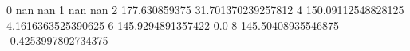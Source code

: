 0 nan nan
1 nan nan
2 177.630859375 31.701370239257812
4 150.09112548828125 4.1616363525390625
6 145.9294891357422 0.0
8 145.50408935546875 -0.4253997802734375
